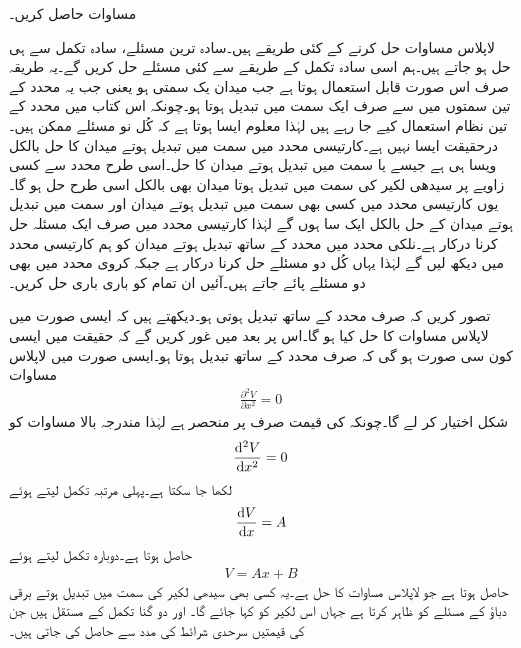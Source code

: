مساوات  حاصل کریں۔

لاپلاس مساوات حل کرنے کے کئی طریقے ہیں۔سادہ ترین مسئلے، سادہ تکمل سے ہی حل ہو جاتے ہیں۔ہم اسی سادہ تکمل کے طریقے سے کئی مسئلے حل کریں گے۔یہ طریقہ صرف اس صورت قابل استعمال ہوتا ہے جب میدان یک سمتی ہو یعنی جب یہ محدد کے تین سمتوں میں سے صرف ایک سمت میں تبدیل ہوتا ہو۔چونکہ اس کتاب میں محدد کے تین نظام استعمال کیے جا رہے ہیں لہٰذا معلوم ایسا ہوتا ہے کہ  کُل نو مسئلے ممکن ہیں۔درحقیقت ایسا نہیں ہے۔کارتیسی محدد میں  سمت میں تبدیل ہوتے میدان کا حل بالکل ویسا ہی ہے جیسے  یا  سمت میں تبدیل ہوتے میدان کا حل۔اسی طرح  محدد سے کسی زاویے پر سیدھی لکیر کی سمت میں تبدیل ہوتا میدان بھی بالکل اسی طرح حل ہو گا۔یوں کارتیسی محدد میں کسی بھی سمت میں تبدیل ہوتے میدان اور  سمت میں تبدیل ہوتے میدان کے حل بالکل ایک سا ہوں گے لہٰذا کارتیسی محدد میں صرف ایک مسئلہ حل کرنا درکار ہے۔نلکی محدد میں  محدد کے ساتھ تبدیل ہوتے میدان کو ہم کارتیسی محدد میں دیکھ لیں گے لہٰذا یہاں کُل دو مسئلے حل کرنا درکار ہے جبکہ کروی محدد میں بھی دو مسئلے پائے جاتے ہیں۔آئیں ان تمام کو باری باری حل کریں۔

تصور کریں کہ  صرف  محدد کے ساتھ تبدیل ہوتی ہو۔دیکھتے ہیں کہ ایسی صورت میں لاپلاس مساوات کا حل کیا ہو گا۔اس پر بعد میں غور کریں گے کہ حقیقت میں ایسی کون سی صورت ہو گی کہ  صرف  محدد کے ساتھ تبدیل ہوتا ہو۔ایسی صورت میں لاپلاس مساوات
\begin{align*}
\frac{\partial^2 V}{\partial x^2}=0
\end{align*}
شکل اختیار کر لے گا۔چونکہ  کی قیمت صرف  پر منحصر ہے لہٰذا مندرجہ بالا مساوات کو
\begin{align*}
\frac{\dif{\hspace{0.1pt} ^2} V}{\dif x^2}=0
\end{align*}
لکھا جا سکتا ہے۔پہلی مرتبہ تکمل لیتے ہوئے
\begin{align*}
\frac{\dif V}{\dif x}=A
\end{align*}
حاصل ہوتا ہے۔دوبارہ تکمل لیتے ہوئے
\begin{align}\label{مساوات_لاپلاس_کارتیسی_حل}
V=Ax+B
\end{align}
حاصل ہوتا ہے جو لاپلاس مساوات کا حل ہے۔یہ کسی بھی سیدھی لکیر کی سمت میں تبدیل ہوتے برقی دباؤ کے مسئلے کو ظاہر کرتا ہے جہاں اس لکیر کو  کہا جائے گا۔ اور  دو گنا تکمل کے مستقل ہیں جن کی قیمتیں سرحدی شرائط کی مدد سے حاصل کی جاتی ہیں۔

